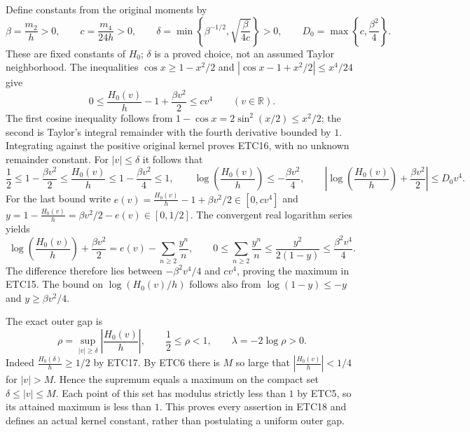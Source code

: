 Define constants from the original moments by
\begin{equation}\tag{ETC15}
 \beta=\frac{m_2}{h}>0,\qquad c=\frac{m_4}{24h}>0,
 \qquad \delta=\min\left\{\beta^{-1/2},
                       \sqrt{\frac{\beta}{4c}}\right\}>0,
 \qquad D_0=\max\left\{c,\frac{\beta^2}{4}\right\}.
\end{equation}
These are fixed constants of $H_0$; $\delta$ is a proved
choice, not an assumed Taylor neighborhood. The inequalities
$\cos x\ge1-x^2/2$ and
$|\cos x-1+x^2/2|\le x^4/24$ give
\begin{equation}\tag{ETC16}
 0\le \frac{H_0(v)}{h}-1+\frac{\beta v^2}{2}\le cv^4
                       \qquad(v\in\mathbb R).
\end{equation}
The first cosine inequality follows from
$1-\cos x=2\sin^2(x/2)\le x^2/2$; the second is Taylor's
integral remainder with the fourth derivative bounded by
$1$. Integrating against the positive original kernel
proves ETC16, with no unknown remainder constant.
For $|v|\le\delta$ it follows that
\begin{equation}\tag{ETC17}
 \frac12\le1-\frac{\beta v^2}{2}\le \frac{H_0(v)}{h}
        \le1-\frac{\beta v^2}{4}\le1,\qquad
 \log\left(\frac{H_0(v)}{h}\right)\le-\frac{\beta v^2}{4},\qquad
 \left|\log\left(\frac{H_0(v)}{h}\right)+\frac{\beta v^2}{2}\right|\le D_0v^4.
\end{equation}
For the last bound write
$e(v)=\frac{H_0(v)}{h}-1+\beta v^2/2\in[0,cv^4]$ and
$y=1-\frac{H_0(v)}{h}=\beta v^2/2-e(v)\in[0,1/2]$.
The convergent real logarithm series yields
\[
 \log\left(\frac{H_0(v)}{h}\right)+\frac{\beta v^2}{2}
 =e(v)-\sum_{n\ge2}\frac{y^n}{n},\qquad
 0\le\sum_{n\ge2}\frac{y^n}{n}
       \le\frac{y^2}{2(1-y)}\le\frac{\beta^2v^4}{4}.
\]
The difference therefore lies between
$-\beta^2v^4/4$ and $cv^4$, proving the maximum in ETC15.
The bound on $\log(H_0(v)/h)$ follows also from $\log(1-y)\le-y$
and $y\ge\beta v^2/4$.

The exact outer gap is
\begin{equation}\tag{ETC18}
 \rho=\sup_{|v|\ge\delta}|\frac{H_0(v)}{h}|,\qquad
 \frac12\le\rho<1,\qquad \lambda=-2\log\rho>0.
\end{equation}
Indeed $\frac{H_0(\delta)}{h}\ge1/2$ by ETC17. By ETC6 there is $M$
so large that $|\frac{H_0(v)}{h}|<1/4$ for $|v|>M$. Hence the
supremum equals a maximum on the compact set
$\delta\le|v|\le M$. Each point of this set has modulus
strictly less than $1$ by ETC5, so its attained maximum is
less than $1$. This proves every assertion in ETC18 and
defines an actual kernel constant, rather than postulating
a uniform outer gap.

